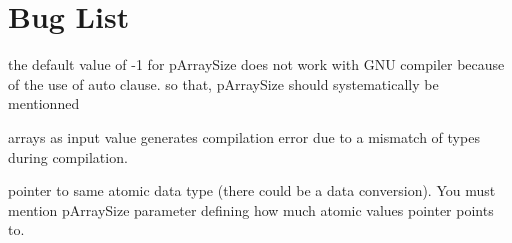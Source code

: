 \chapter{Bug List}
\hypertarget{bug}{}\label{bug}

\begin{DoxyRefList}
\item[Member \doxylink{zdataconversion_8h_aac7aee31f155632d1e1e8931f24cbce5}{zget\+Universal\+From\+Natural} (auto p\+Value, ZData\+Buffer \&p\+Universal, long \&p\+Array\+Size)]\label{bug__bug000001}%
%
the default value of -\/1 for p\+Array\+Size does not work with GNU compiler because of the use of \textquotesingle{}auto\textquotesingle{} clause. so that, p\+Array\+Size should systematically be mentionned 
\item[Module \doxylink{group___z_key_correspondence}{ZKey\+Correspondence} ]\label{bug__bug000003}%
%
arrays as input value generates compilation error due to a mismatch of types during compilation.
\begin{DoxyItemize}
\item pointer to same atomic data type (there could be a data conversion). You must mention p\+Array\+Size parameter defining how much atomic values pointer points to.
\end{DoxyItemize}
\end{DoxyRefList}